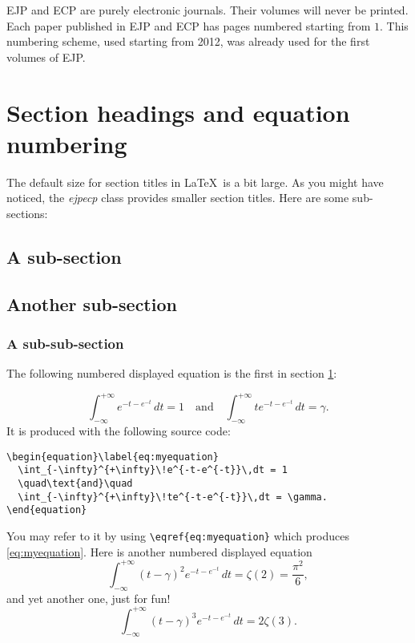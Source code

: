 \documentclass[ECP]{ejpecp} %
\begin{document}
EJP and ECP are purely electronic journals. Their volumes will never be
printed. Each paper published in EJP and ECP has pages numbered starting from
$1$. This numbering scheme, used starting from 2012, was already used for the
first volumes of EJP.

\section{Section headings and equation numbering}\label{se:mysection}

The default size for section titles in \LaTeX\ is a bit large. As you might have
noticed, the \emph{ejpecp} class provides smaller section titles. Here are some
sub-sections:

\subsection{A sub-section}

\subsection{Another sub-section}

\subsubsection{A sub-sub-section}

The following numbered displayed equation is the first in section \ref{se:mysection}:

\begin{equation}\label{eq:myequation}
  \int_{-\infty}^{+\infty}\!e^{-t-e^{-t}}\,dt = 1
  \quad\text{and}\quad
  \int_{-\infty}^{+\infty}\!te^{-t-e^{-t}}\,dt = \gamma.
\end{equation}
It is produced with the following source code:
\begin{verbatim}
\begin{equation}\label{eq:myequation}
  \int_{-\infty}^{+\infty}\!e^{-t-e^{-t}}\,dt = 1
  \quad\text{and}\quad
  \int_{-\infty}^{+\infty}\!te^{-t-e^{-t}}\,dt = \gamma.
\end{equation}
\end{verbatim}
You may refer to it by using \verb+\eqref{eq:myequation}+ which
produces \eqref{eq:myequation}. Here is another numbered displayed equation
\begin{equation}
  \int_{-\infty}^{+\infty}\!(t-\gamma)^2e^{-t-e^{-t}}\,dt 
  = \zeta(2) 
  = \frac{\pi^2}{6},
\end{equation}
and yet another one, just for fun!
\begin{equation}
  \int_{-\infty}^{+\infty}\!(t-\gamma)^3e^{-t-e^{-t}}\,dt 
  = 2\zeta(3).
\end{equation}
\end{document}
